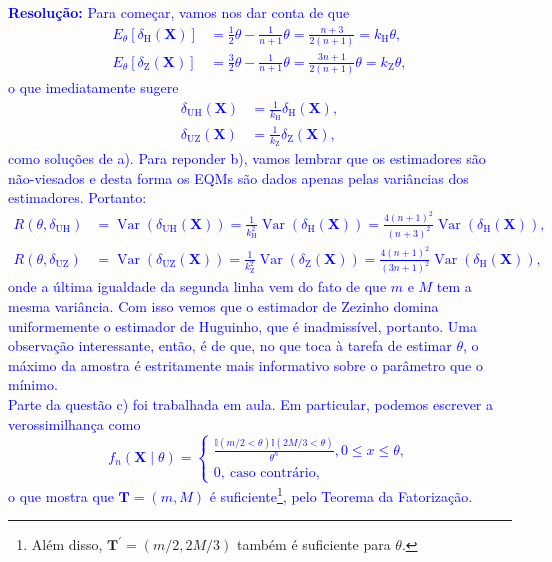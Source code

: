 \documentclass[a4paper,10pt, notitlepage]{report}
\newcommand{\vr}{\operatorname{Var}} %
\newcommand{\bX}{\boldsymbol{X}} %
\begin{document}
\textcolor{blue}{
\textbf{Resolução:} Para começar, vamos nos dar conta de que 
\begin{align*}
 E_\theta\left[\delta_{\text{H}}(\bX)\right] &= \frac{1}{2}\theta - \frac{1}{n+1}\theta = \frac{n+3}{2(n+1)} = k_{\text{H}}\theta,\\
 E_\theta\left[\delta_{\text{Z}}(\bX) \right] &= \frac{3}{2}\theta - \frac{1}{n+1}\theta = \frac{3n + 1}{2(n+1)}\theta = k_{\text{Z}}\theta,
\end{align*}
o que imediatamente sugere
\begin{align*}
 \delta_{\text{UH}}(\bX) &= \frac{1}{k_{\text{H}}}\delta_{\text{H}}(\bX),\\
\delta_{\text{UZ}}(\bX) &= \frac{1}{k_{\text{Z}}}\delta_{\text{Z}}(\bX),
\end{align*}
como soluções de a).
Para reponder b), vamos lembrar que os estimadores são não-viesados e desta forma os EQMs são dados apenas pelas variâncias dos estimadores.
Portanto:
\begin{align*}
R\left(\theta, \delta_{\text{UH}}\right) &= \vr\left(\delta_{\text{UH}}(\bX)\right) = \frac{1}{k_{\text{H}}^2}\vr\left( \delta_{\text{H}}(\bX)\right) = \frac{4(n+1)^2}{(n+3)^2}\vr\left( \delta_{\text{H}}(\bX)\right),\\
R\left(\theta, \delta_{\text{UZ}}\right) &= \vr\left(\delta_{\text{UZ}}(\bX)\right) = \frac{1}{k_{\text{Z}}^2}\vr\left( \delta_{\text{Z}}(\bX)\right) = \frac{4(n+1)^2}{(3n+1)^2}\vr\left( \delta_{\text{H}}(\bX)\right),
\end{align*}
onde a última igualdade da segunda linha vem do fato de que $m$ e $M$ tem a mesma variância. 
Com isso vemos que o estimador de Zezinho domina uniformemente o estimador de Huguinho, que é inadmissível, portanto.
Uma observação interessante, então, é de que, no que toca à tarefa de estimar $\theta$, o máximo da amostra é estritamente mais informativo sobre o parâmetro que o mínimo.
\\
Parte da questão c) foi trabalhada em aula.
Em particular, podemos escrever a verossimilhança como
$$
f_n(\bX \mid \theta) =  \begin{cases}
     \frac{\mathbb{I}\left( m/2 < \theta\right)\mathbb{I}\left(2M/3 < \theta\right)}{\theta^n}, 0 \leq x \leq \theta,\\
     0,\:\text{caso contrário},
\end{cases}
$$
o que mostra que $\boldsymbol{T} = (m, M)$ é suficiente\footnote{Além disso, $\boldsymbol{T}^\prime = (m/2, 2M/3)$ também é suficiente para $\theta$.}, pelo Teorema da Fatorização.
}
\end{document}
